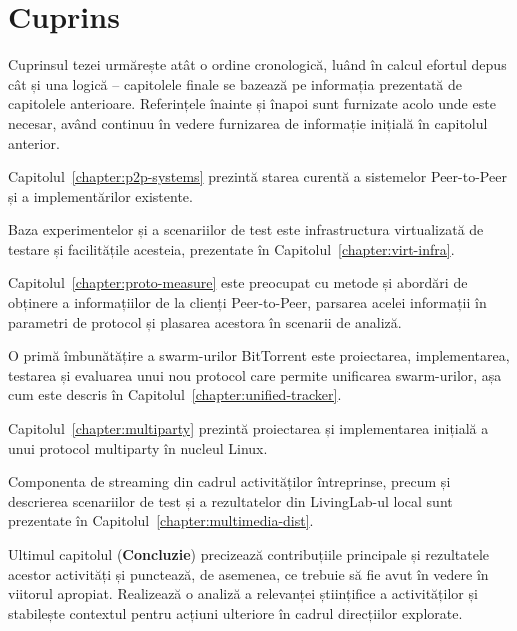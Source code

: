 \section{Cuprins}
\label{sec:intro:contents}

Cuprinsul tezei urmărește atât o ordine cronologică, luând în calcul efortul
depus cât și una logică -- capitolele finale se bazează pe informația
prezentată de capitolele anterioare. Referințele înainte și înapoi sunt
furnizate acolo unde este necesar, având continuu în vedere furnizarea de
informație inițială în capitolul anterior.

Capitolul~\ref{chapter:p2p-systems} prezintă starea curentă a sistemelor
Peer-to-Peer și a implementărilor existente.

Baza experimentelor și a scenariilor de test este infrastructura virtualizată
de testare și facilitățile acesteia, prezentate în
Capitolul~\ref{chapter:virt-infra}.

Capitolul~\ref{chapter:proto-measure} este preocupat cu metode și abordări de
obținere a informațiilor de la clienți Peer-to-Peer, parsarea acelei
informații în parametri de protocol și plasarea acestora în scenarii de
analiză.

O primă îmbunătățire a swarm-urilor BitTorrent este proiectarea,
implementarea, testarea și evaluarea unui nou protocol care permite unificarea
swarm-urilor, așa cum este descris în Capitolul~\ref{chapter:unified-tracker}.

Capitolul~\ref{chapter:multiparty} prezintă proiectarea și implementarea
inițială a unui protocol multiparty în nucleul Linux.

Componenta de streaming din cadrul activităților întreprinse, precum și
descrierea scenariilor de test și a rezultatelor din LivingLab-ul local sunt
prezentate în Capitolul~\ref{chapter:multimedia-dist}.

Ultimul capitolul (\textbf{Concluzie}) precizează contribuțiile principale și
rezultatele acestor activități și punctează, de asemenea, ce trebuie să fie
avut în vedere în viitorul apropiat. Realizează o analiză a relevanței
științifice a activităților și stabilește contextul pentru acțiuni ulteriore
în cadrul direcțiilor explorate.
